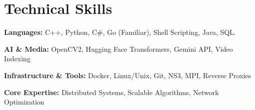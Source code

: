 
\section{Technical Skills}
\begin{innerlist}
    \item \textbf{Languages:} C++, Python, C\#, Go (Familiar), Shell Scripting, Java, SQL.
    \item \textbf{AI \& Media:} OpenCV2, Hugging Face Transformers, Gemini API, Video Indexing
    \item \textbf{Infrastructure \& Tools:} Docker, Linux/Unix, Git, NS3, MPI, Reverse Proxies
    \item \textbf{Core Expertise:} Distributed Systems, Scalable Algorithms, Network Optimization
\end{innerlist}